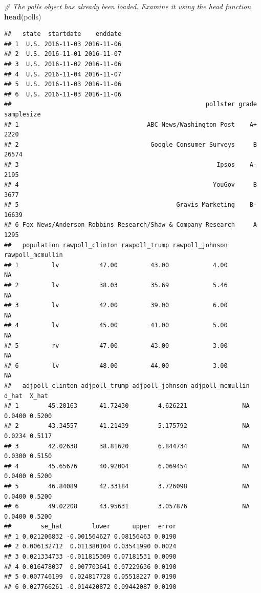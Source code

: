 \documentclass[
]{article}
\newenvironment{Shaded}{\begin{snugshade}}{\end{snugshade}}
\newcommand{\CommentTok}[1]{\textcolor[rgb]{0.56,0.35,0.01}{\textit{#1}}}
\newcommand{\KeywordTok}[1]{\textcolor[rgb]{0.13,0.29,0.53}{\textbf{#1}}}
\newcommand{\NormalTok}[1]{#1}
\begin{document}
\begin{Shaded}
\begin{Highlighting}[]
\CommentTok{\# The \textasciigrave{}polls\textasciigrave{} object has already been loaded. Examine it using the \textasciigrave{}head\textasciigrave{} function.}
\KeywordTok{head}\NormalTok{(polls)}
\end{Highlighting}
\end{Shaded}

\begin{verbatim}
##   state  startdate    enddate
## 1  U.S. 2016-11-03 2016-11-06
## 2  U.S. 2016-11-01 2016-11-07
## 3  U.S. 2016-11-02 2016-11-06
## 4  U.S. 2016-11-04 2016-11-07
## 5  U.S. 2016-11-03 2016-11-06
## 6  U.S. 2016-11-03 2016-11-06
##                                                     pollster grade samplesize
## 1                                   ABC News/Washington Post    A+       2220
## 2                                    Google Consumer Surveys     B      26574
## 3                                                      Ipsos    A-       2195
## 4                                                     YouGov     B       3677
## 5                                           Gravis Marketing    B-      16639
## 6 Fox News/Anderson Robbins Research/Shaw & Company Research     A       1295
##   population rawpoll_clinton rawpoll_trump rawpoll_johnson rawpoll_mcmullin
## 1         lv           47.00         43.00            4.00               NA
## 2         lv           38.03         35.69            5.46               NA
## 3         lv           42.00         39.00            6.00               NA
## 4         lv           45.00         41.00            5.00               NA
## 5         rv           47.00         43.00            3.00               NA
## 6         lv           48.00         44.00            3.00               NA
##   adjpoll_clinton adjpoll_trump adjpoll_johnson adjpoll_mcmullin  d_hat  X_hat
## 1        45.20163      41.72430        4.626221               NA 0.0400 0.5200
## 2        43.34557      41.21439        5.175792               NA 0.0234 0.5117
## 3        42.02638      38.81620        6.844734               NA 0.0300 0.5150
## 4        45.65676      40.92004        6.069454               NA 0.0400 0.5200
## 5        46.84089      42.33184        3.726098               NA 0.0400 0.5200
## 6        49.02208      43.95631        3.057876               NA 0.0400 0.5200
##        se_hat        lower      upper  error
## 1 0.021206832 -0.001564627 0.08156463 0.0190
## 2 0.006132712  0.011380104 0.03541990 0.0024
## 3 0.021334733 -0.011815309 0.07181531 0.0090
## 4 0.016478037  0.007703641 0.07229636 0.0190
## 5 0.007746199  0.024817728 0.05518227 0.0190
## 6 0.027766261 -0.014420872 0.09442087 0.0190
\end{verbatim}
\end{document}

